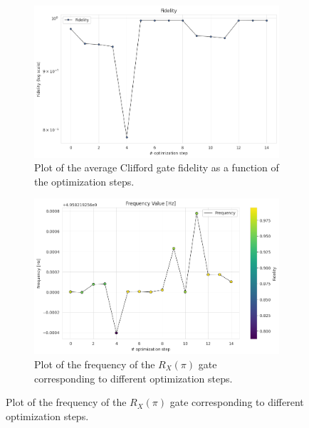 \begin{figure}[h]
    \centering
    \begin{subfigure}[t]{0.45\textwidth}
        \includegraphics[width=\textwidth]{figures/png/RB_optimization/SLSQP/fidelity.png}
        \caption{Plot of the average Clifford gate fidelity as a function of the optimization steps.}
        \label{fig:SLSQP:fidelity}
    \end{subfigure}
    \hfill
    \begin{subfigure}[t]{0.45\textwidth}
        \includegraphics[width=\textwidth]{figures/png/RB_optimization/SLSQP/frequency.png}
        \caption{Plot of the frequency of the $R_X(\pi)$ gate corresponding to different optimization steps.}
        \label{fig:SLSQP:frequency}
    \end{subfigure}

    \vspace{0.5cm}


\end{figure}
